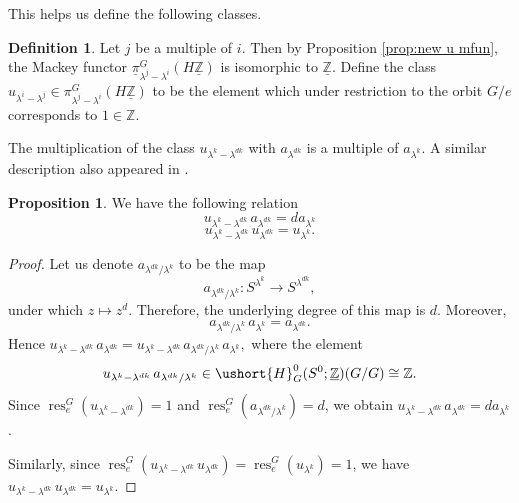 \documentclass[a4paper,leqno,11pt]{amsart}
\theoremstyle{plain}
\theoremstyle{definition}
\newtheorem{prop}[theorem]{Proposition}
\newtheorem{defn}[theorem]{Definition}
\theoremstyle{remark}
\theoremstyle{definition}
\newcommand{\Z}{{\mathbb{Z}}}
\newcommand{\upi}{\underline{\pi}}
\newcommand{\res}{\mathit{res}}
\newcommand{\uH}{\ushort{H}}
\newcommand{\uZ}{\underline{\mathbb{Z}}}
\def\Z{\mathbb{Z}}
\def\lam{\lambda}
\numberwithin{equation}{section}
\renewcommand{\res}{\operatorname{res}}
\begin{document}
	This helps us define the following classes.
	\begin{defn}\label{def:new u-class}
		Let $ j $ be a  multiple of $ i $. Then by Proposition \ref{prop:new u mfun}, the Mackey functor  $ \upi^G_{\lambda^j-\lambda^i}(H\uZ) $ is isomorphic to $ \uZ $.
		Define the class $ u_{\lambda^i-\lambda^j} \in  \pi^G_{\lambda^j-\lambda^i}(H\uZ)$ to be the element which  under restriction to the orbit $ G/e $ corresponds to $1\in \Z $. 
	\end{defn}
The multiplication of the class $ u_{\lambda^k-\lambda^{dk}} $ with $ a_{\lam^{dk}} $ is a multiple of $a_{\lam^k}  $. A similar description also appeared in \cite[p. 395]{HHR-realKthy}.
	\begin{prop}\label{prop:new u cls rel with a cls}  
		We have the following relation
		\[
		u_{\lam^{k}-\lam^{dk}}\, a_{\lam^{dk}}=da_{\lam^k}
		\]
		\[
		u_{\lam^{k}-\lam^{dk}}\, u_{\lam^{dk}}=u_{\lam^k}.
		\]
	\end{prop}
\begin{proof}
	Let us  denote $ a_{{\lambda^{dk}}/{\lambda^k}} $  to be the map 
	$$a_{{\lambda^{dk}}/{\lambda^k}} :S^{\lambda^k}\to S^{\lambda^{dk}},
	$$
	under which  $ z\mapsto z^d $. Therefore, the underlying degree of this map is $ d $. Moreover, 
	$$ a_{{\lambda^{dk}}/{\lambda^k}} \,a_{\lambda^k} =a_{\lambda^{dk}}.
	$$ 
	Hence $ u_{\lam^{k}-\lam^{dk}}\, a_{\lam^{dk}}=u_{\lam^{k}-\lam^{dk}}\, a_{{\lambda^{dk}}/{\lambda^k}}\, a_{\lambda^k}, $
	where the element 
	$$ u_{\lam^{k}-\lam^{dk}}\, a_{{\lambda^{dk}}/{\lambda^k}} \in \uH^0_G(S^0;\uZ)(G/G)\cong \Z.
	$$
	 Since $ \res^G_e( u_{\lam^{k}-\lam^{dk}}) =1$ and $ \res^G_e(a_{{\lambda^{dk}}/{\lambda^k}})=d $, we obtain  $ u_{\lam^{k}-\lam^{dk}}\, a_{\lam^{dk}}=da_{\lam^k} $.
	 
	 Similarly, since $ \res^G_e(u_{\lam^{k}-\lam^{dk}}\, u_{\lam^{dk}})= \res^G_e(u_{\lam^k})=1$, we have $ u_{\lam^{k}-\lam^{dk}}\, u_{\lam^{dk}}=u_{\lam^k}. $
\end{proof}
\end{document}

